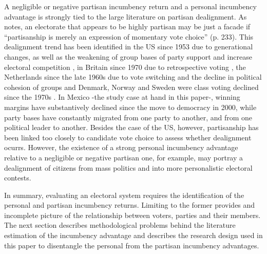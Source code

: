 A negligible or negative partisan incumbency return and a personal incumbency advantage is strongly tied to the large literature on partisan dealignment. As \citet{beck_1985} notes, an electorate that appears to be highly partisan may be just a facade if ``partisanship is merely an expression of momentary vote choice'' (p. 233). This dealignment trend has been identified in the US since 1953 due to generational changes, as well as the weakening of group bases of party support and increase electoral competition \citep{beck_1977, norpoth_rusk_1982}, in Britain since 1970 due to retrospective voting \citep{alt_1977}, the Netherlands since the late 1960s due to vote switching and the decline in political cohesion of groups \citep{irwin_dittrich} and Denmark, Norway and Sweden were class voting declined since the 1970s \citep{borre_1995}. In Mexico -the study case at hand in this paper-, winning margins have substantively declined since the move to democracy in 2000, while party bases have constantly migrated from one party to another, and from one political leader to another. Besides the case of the US, however, partisanship has been linked too closely to candidate vote choice to assess whether dealignment ocurrs.  However, the existence of a strong personal incumbency advantage relative to a negligible or negative partisan one, for example, may portray a dealignment of citizens from mass politics and into more personalistic electoral contests. 
   
In summary, evaluating an electoral system requires the identification of the personal and partisan incumbency returns. Limiting to the former provides and incomplete picture of the relationship between voters, parties and their members. The next section describes methodological problems behind the literature estimation of the incumbency advantage and describes the research design used in this paper to disentangle the personal from the partisan incumbency advantages. 


